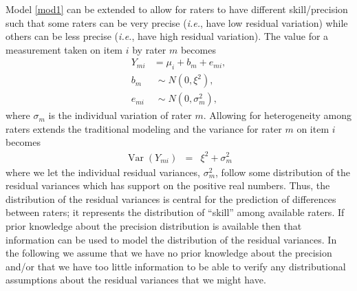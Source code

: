 \documentclass[aoas]{imsart}
\makeatletter
\newcommand{\V}{\operatorname{Var}}
\newcommand{\ie}{\emph{i.e.}\@\xspace}
\makeatother
\begin{document}
Model \eqref{mod1} can be extended to allow for raters to have
different skill/precision such that some raters can be very precise
(\ie, have low residual variation) while others can be less precise
(\ie, have high residual variation). The value for a measurement taken
on item $i$ by rater $m$ becomes
\begin{equation} \label{mod2}
\begin{split}
Y_{mi} &= \mu_i + b_m + e_{mi}, \\
b_m &~ \sim N(0, \xi^2), \\
e_{mi} &~ \sim N(0, \sigma_m^2),
\end{split}
\end{equation}
where $\sigma_m$ is the individual variation of rater $m$.  Allowing
for heterogeneity among raters extends the traditional modeling and
the variance for rater $m$ on item $i$ becomes
\begin{eqnarray*}
\V(Y_{mi}) & = & \xi^2 + \sigma_m^2
\end{eqnarray*}
where we let the individual residual variances, $\sigma_m^2$, follow
some distribution of the residual variances which has support on the
positive real numbers.
Thus, the distribution of the residual variances is central for the
prediction of differences between raters; it represents the
distribution of ``skill'' among available raters.  If prior knowledge
about the precision distribution is available then that information
can be used to model the distribution of the residual variances.  In
the following we assume that we have no prior knowledge about the
precision and/or that we have too little information to be able to
verify any distributional assumptions about the residual variances
that we might have.
\end{document}
